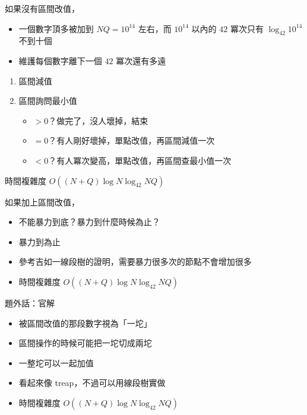 \begin{frame}{}
    如果沒有區間改值，
    
    \begin{itemize}
        \item 一個數字頂多被加到 $NQ = 10^{14}$ 左右，而 $10^{14}$ 以內的 $42$ 冪次只有 $\log_{42} 10^{14}$ 不到十個
        \item 維護每個數字離下一個 $42$ 冪次還有多遠
    \end{itemize}
    \begin{enumerate}
        \item 區間減值
        \item 區間詢問最小值
        \begin{itemize}
            \item $> 0$？做完了，沒人壞掉，結束
            \item $= 0$？有人剛好壞掉，單點改值，再區間減值一次
            \item $< 0$？有人冪次變高，單點改值，再區間查最小值一次
        \end{itemize}
    \end{enumerate}

    時間複雜度 $O((N + Q) \log N \log_{42} NQ)$
\end{frame}

\begin{frame}{}
    如果加上區間改值，

     {
        \begin{itemize}
            \item 不能暴力到底？暴力到什麼時候為止？
        \end{itemize}
    }
    
     {
        \begin{itemize}
            \item 暴力到為止
            \item 參考吉如一線段樹的證明，需要暴力很多次的節點不會增加很多
            \item 時間複雜度 $O((N + Q) \log N \log_{42} NQ)$
        \end{itemize}
    }
\end{frame}

\begin{frame}{}
    題外話：官解

    \begin{itemize}
        \item 被區間改值的那段數字視為「一坨」
        \item 區間操作的時候可能把一坨切成兩坨
        \item 一整坨可以一起加值
        \item 看起來像 treap，不過可以用線段樹實做
        \item 時間複雜度 $O((N + Q) \log N \log_{42} NQ)$
    \end{itemize}
\end{frame}

